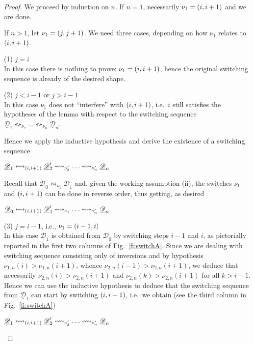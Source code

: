 \documentclass[a4paper,UKenglish,cleveref,pdftex,thm-restate,numberwithinsect]{lipics-v2021}
\newcommand{\dder}[1]{\mathscr{#1}}
\newcommand{\der}[1]{\underline{\dder{#1}}}
\newcommand{\shift}[1]{\ensuremath{\mathrel{{\leftrightsquigarrow}_{#1}}}}
\begin{document}
\begin{proof}
  We proceed by induction on $n$. If $n=1$, necessarily
  $\nu_1 =  \transp{i}$ and we are done.

  If $n>1$, let $\nu_1 = \transp{j}$.  We need three cases,
  depending on how $\nu_1$ relates to $\transp{i}$.

  \bigskip
  \noindent
  (1) $j=i$\\
  In this case there is nothing to prove: $\nu_1 = \transp{i}$, hence
  the original switching sequence is already of the desired shape.

  \bigskip
  \noindent
  (2) $j<i-1$ or $j>i-1$\\
  In this case $\nu_1$ does not ``interfere'' with $\transp{i}$, i.e.~$i$ still satisfies the hypotheses of the lemma with respect to the
  switching sequence
  $\der{D}_1 \shift{\nu_2} \ldots \shift{\nu_n} \der{D}_n$.

  Hence we apply the inductive hypothesis and derive the existence
  of a switching sequence
  \begin{center}
    $\der{D}_1 \shift{\transp{i}} \der{D}_2' \shift{\nu_3'} \ldots \shift{\nu_n'} \der{D}_n$
  \end{center}

  Recall that $\der{D}_0 \shift{\nu_1} \der{D}_1$ and, given the
  working assumption (ii), the switches $\nu_1$ and $\transp{i}$ can
  be done in reverse order, thus getting, as desired
  \begin{center}
    $\der{D}_0 \shift{\transp{i}} \der{D}_1' \shift{\nu_1} \ldots
    \shift{\nu_n'} \der{D}_n$
  \end{center}


  \bigskip
  \noindent
  (3) $j=i-1$, i.e., $\nu_1 = \transp{i-1}[i]$\\
  In this case $\der{D}_1$ is obtained from $\der{D}_0$ by switching
  steps $i-1$ and $i$, as pictorially reported in the first two
  columns of Fig.~\ref{fi:switchA}. Since we are dealing with
  switching sequence consisting only of inversions and by hypothesis
  $\nu_{1,n}(i) > \nu_{1,n}(i+1)$, whence
  $\nu_{2,n}(i-1) > \nu_{2,n}(i+1)$, we deduce that necessarily
  $\nu_{2,n}(i) > \nu_{2,n}(i+1)$ and $\nu_{2,n}(k) > \nu_{2,n}(i+1)$
  for all $k > i+1$. Hence we can use the inductive hypothesis to
  deduce that the switching sequence from $\der{D}_1$ can start by
  switching $\transp{i}$, i.e.~we obtain (see the third column in
  Fig.~\ref{fi:switchA})
  \begin{center}
    $\der{D}_1 \shift{\transp{i}} \der{D}_2' \shift{\nu_3'} \ldots
    \shift{\nu_n'} \der{D}_n$
  \end{center}


\end{proof}
\end{document}
